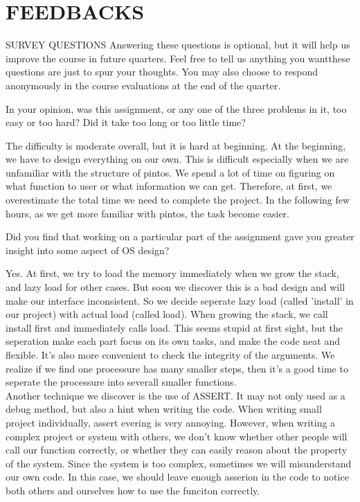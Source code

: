 \section*{FEEDBACKS}
\begin{aspect}{SURVEY QUESTIONS}
	Answering these questions is optional, but it will help us improve the course in future quarters.
	Feel free to tell us anything you wantthese questions are just to spur your thoughts.
	You may also choose to respond anonymously in the course evaluations at the end of the quarter.

	\begin{qc}
		In your opinion,
		was this assignment, or any one of the three problems in it, too easy or too hard?
		Did it take too long or too little time?
	\end{qc}
	The difficulty is moderate overall, but it is hard at beginning. At the beginning, we have to design everything on our own. This is difficult especially when we are unfamiliar with the structure of pintos. We spend a lot of time on figuring on what function to user or what information we can get. Therefore, at first, we overestimate the total time we need to complete the project. In the following few hours, as we get more familiar with pintos, the task become easier.

	\begin{qc}
		Did you find that working on a particular part of the assignment
		gave you greater insight into some aspect of OS design?
	\end{qc}

	Yes. At first, we try to load the memory immediately when we grow the stack, and lazy load for other cases. But soon we discover this is a bad design and will make our interface inconsistent. So we decide seperate lazy load (called 'install' in our project) with actual load (called load). When growing the stack, we call install first and immediately calls load. This seems stupid at first sight, but the seperation make each part focus on its own tasks, and make the code neat and flexible. It's also more convenient to check the integrity of the arguments. We realize if we find one processure has many smaller steps, then it's a good time to seperate the processure into severall smaller functions.\\
	Another technique we discover is the use of ASSERT. It may not only used as a debug method, but also a hint when writing the code. When writing small project individually, assert evering is very annoying. However, when writing a complex project or system with others, we don't know whether other people will call our function correctly, or whether they can easily reason about the property of the system. Since the system is too complex, sometimes we will misunderstand our own code. In this case, we should leave enough asserion in the code to notice both others and ourselves how to use the funciton correctly.



\end{aspect}
